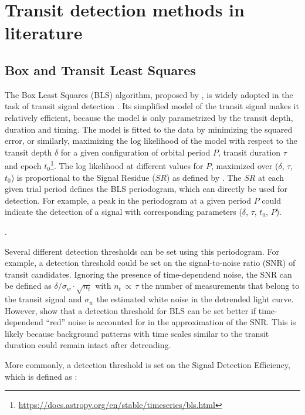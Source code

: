 
\section{Transit detection methods in literature}


\subsection{Box and Transit Least Squares}

The Box Least Squares (BLS) algorithm, proposed by \cite{kovacs2002box}, is widely adopted in the task of transit signal detection . Its simplified model of the transit signal makes it relatively efficient, because the model is only parametrized by the transit depth, duration and timing. The model is fitted to the data by minimizing the squared error, or similarly, maximizing the log likelihood of the model with respect to the transit depth $\delta$ for a given configuration of orbital period $P$, transit duration $\tau$ and epoch $t_0$\footnote{\url{https://docs.astropy.org/en/stable/timeseries/bls.html}}. The log likelihood at different values for $P$, maximized over ($\delta$, $\tau$, $t_0$) is proportional to the Signal Residue ($SR$) as defined by \cite{kovacs2002box}. The $SR$ at each given trial period defines the BLS periodogram, which can directly be used for detection. For example, a peak in the periodogram at a given period $P$ could indicate the detection of a signal with corresponding parameters ($\delta$, $\tau$, $t_0$, $P$).

.

Several different detection thresholds can be set using this periodogram. For example, a detection threshold could be set on the signal-to-noise ratio (SNR) of transit candidates. Ignoring the presence of time-dependend noise, the SNR can be defined as $\delta / \sigma_w \cdot \sqrt{n_t}$ with $n_t \,\propto\, \tau$ the number of measurements that belong to the transit signal and $\sigma_w$ the estimated white noise in the detrended light curve. However, \cite{pont2006effect} show that a detection threshold for BLS can be set better if time-dependend ``red'' noise is accounted for in the approximation of the SNR. This is likely because background patterns with time scales similar to the transit duration could remain intact after detrending.

More commonly, a detection threshold is set on the Signal Detection Efficiency, which is defined as \citep{kovacs2002box}:

